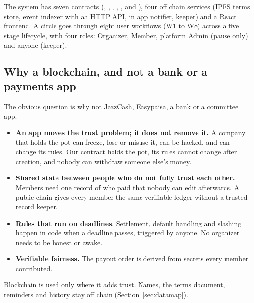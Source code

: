 {\sloppy The system has seven contracts (, ,
, , ,  and
), four off chain services (IPFS terms store, event indexer with an HTTP API, in app notifier, keeper) and a
React frontend. A circle goes through eight user workflows (W1 to W8) across a five stage lifecycle,
with four roles: Organizer, Member, platform Admin (pause only) and anyone (keeper).\par}

\subsection{Why a blockchain, and not a bank or a payments app}
The obvious question is why not JazzCash, Easypaisa, a bank or a committee app.
\begin{itemize}
  \item \textbf{An app moves the trust problem; it does not remove it.} A company that holds the pot can
        freeze, lose or misuse it, can be hacked, and can change its rules. Our contract holds the pot,
        its rules cannot change after creation, and nobody can withdraw someone else's money.
  \item \textbf{Shared state between people who do not fully trust each other.} Members need one record of
        who paid that nobody can edit afterwards. A public chain gives every member the same
        verifiable ledger without a trusted record keeper.
  \item \textbf{Rules that run on deadlines.} Settlement, default handling and slashing happen in code
        when a deadline passes, triggered by anyone. No organizer needs to be honest or awake.
  \item \textbf{Verifiable fairness.} The payout order is derived from secrets every member contributed.
\end{itemize}
Blockchain is used only where it adds trust. Names, the terms document, reminders and history stay
off chain (Section~\ref{sec:datamap}).

